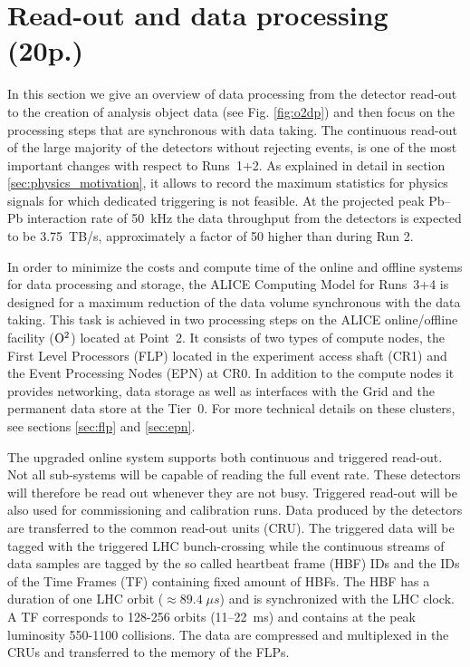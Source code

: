 \section{Read-out and data processing (20p.)}
In this section we give an overview of data processing from the detector read-out to the creation of analysis object data (see Fig. \ref{fig:o2dp})
and then
focus on the processing steps that are synchronous with data taking.
The continuous read-out of the large majority of the detectors without rejecting 
events, is one of the most important changes with respect to Runs~1+2. As explained in 
detail in section \ref{sec:physics_motivation}, it allows to 
record the maximum statistics for physics signals for which dedicated triggering is 
not feasible. At the projected peak Pb--Pb interaction rate of 50~kHz the data throughput from the detectors is expected to be {\color{blue} 3.75~TB/s}, approximately a factor of 50 higher than during Run 2.

In order to minimize the costs and compute time of the online and offline systems
for data processing and storage, the ALICE Computing Model for Runs~3+4 is designed 
for a maximum reduction of the data volume synchronous with the data taking. 
This task is achieved in two processing steps on the ALICE online/offline facility (${\rm O}^2$) located at Point~2.
It consists of two types of compute nodes, the First Level Processors (FLP) located in
the experiment access shaft (CR1) and the Event Processing Nodes (EPN) at CR0. In
addition to the compute
nodes it provides networking, data storage as well as interfaces with the Grid and the
permanent data
store at the Tier~0. For more technical details on these clusters, see sections
\ref{sec:flp} and \ref{sec:epn}.

The upgraded online system supports both continuous and triggered read-out. Not
all sub-systems will be capable of reading the full event rate. These detectors will
therefore be read out whenever they are not busy. Triggered read-out will be also used for commissioning and calibration runs. Data produced by the detectors are transferred to the common read-out units (CRU). The triggered data will be tagged with the triggered LHC bunch-crossing while the continuous streams of data samples are tagged by the so called heartbeat frame (HBF) IDs and the IDs of the Time Frames (TF) containing fixed amount of HBFs.
The HBF has a duration of one LHC orbit ($\approx 89.4\; \mu s$) and is synchronized with the LHC clock. A TF corresponds to 128-256 orbits (11--22~ms) and contains at the peak luminosity 550-1100 collisions.
The data are compressed and multiplexed
in the CRUs and transferred to the memory of the FLPs.

